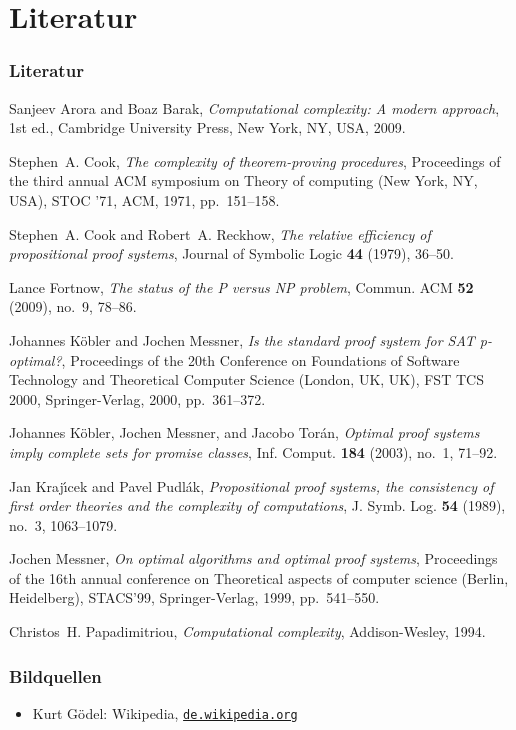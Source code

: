 \section{Literatur}

\begin{frame}[allowframebreaks]
  \frametitle{Literatur}    
  \begin{thebibliography}{KMT03}

    Sanjeev Arora and Boaz Barak, \emph{Computational complexity: A modern
      approach}, 1st ed., Cambridge University Press, New York, NY, USA, 2009.

    Stephen~A. Cook, \emph{The complexity of theorem-proving procedures},
      Proceedings of the third annual ACM symposium on Theory of computing (New
      York, NY, USA), STOC '71, ACM, 1971, pp.~151--158.

    Stephen~A. Cook and Robert~A. Reckhow, \emph{The relative efficiency of
      propositional proof systems}, Journal of Symbolic Logic \textbf{44} (1979),
      36--50.

    Lance Fortnow, \emph{The status of the {P} versus {NP} problem}, Commun. ACM
      \textbf{52} (2009), no.~9, 78--86.

    Johannes K\"{o}bler and Jochen Messner, \emph{Is the standard proof system for
      {SAT} p-optimal?}, Proceedings of the 20th Conference on Foundations of
      Software Technology and Theoretical Computer Science (London, UK, UK), FST
      TCS 2000, Springer-Verlag, 2000, pp.~361--372.

    Johannes K\"{o}bler, Jochen Messner, and Jacobo Tor\'{a}n, \emph{Optimal proof
      systems imply complete sets for promise classes}, Inf. Comput. \textbf{184}
      (2003), no.~1, 71--92.

    Jan Kraj\'{\i}cek and Pavel Pudl{\'a}k, \emph{Propositional proof systems, the
      consistency of first order theories and the complexity of computations}, J.
      Symb. Log. \textbf{54} (1989), no.~3, 1063--1079.

    Jochen Messner, \emph{On optimal algorithms and optimal proof systems},
      Proceedings of the 16th annual conference on Theoretical aspects of computer
      science (Berlin, Heidelberg), STACS'99, Springer-Verlag, 1999, pp.~541--550.

    Christos~H. Papadimitriou, \emph{Computational complexity}, Addison-Wesley,
      1994.

  \end{thebibliography}

\end{frame}

\begin{frame}[allowframebreaks]
  \frametitle{Bildquellen}

  \begin{itemize}
   \item Kurt Gödel: Wikipedia, \texttt{\href{https://de.wikipedia.org/w/index.php?title=Datei:Kurt_g\%C3\%B6del.jpg\&filetimestamp=20110724092213}{de.wikipedia.org}}
  \end{itemize}  
\end{frame}

